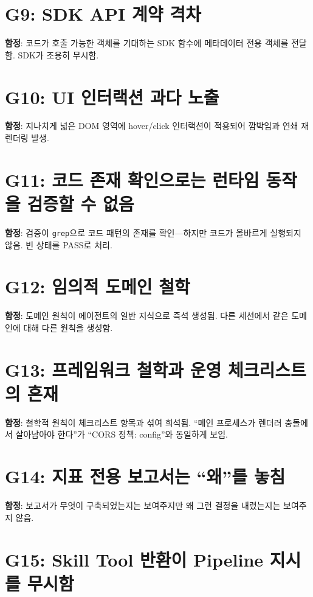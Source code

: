 \documentclass[11pt,a4paper,openright,twoside]{report}
\begin{document}
\section{G9: SDK API 계약 격차}

\textbf{함정}: 코드가 호출 가능한 객체를 기대하는 SDK 함수에 메타데이터 전용 객체를 전달함. SDK가 조용히 무시함.

\section{G10: UI 인터랙션 과다 노출}

\textbf{함정}: 지나치게 넓은 DOM 영역에 hover/click 인터랙션이 적용되어 깜박임과 연쇄 재렌더링 발생.

\section{G11: 코드 존재 확인으로는 런타임 동작을 검증할 수 없음}

\textbf{함정}: 검증이 \texttt{grep}으로 코드 패턴의 존재를 확인---하지만 코드가 올바르게 실행되지 않음. 빈 상태를 PASS로 처리.

\section{G12: 임의적 도메인 철학}

\textbf{함정}: 도메인 원칙이 에이전트의 일반 지식으로 즉석 생성됨. 다른 세션에서 같은 도메인에 대해 다른 원칙을 생성함.

\section{G13: 프레임워크 철학과 운영 체크리스트의 혼재}

\textbf{함정}: 철학적 원칙이 체크리스트 항목과 섞여 희석됨. ``메인 프로세스가 렌더러 충돌에서 살아남아야 한다''가 ``CORS 정책: config''와 동일하게 보임.

\section{G14: 지표 전용 보고서는 ``왜''를 놓침}

\textbf{함정}: 보고서가 무엇이 구축되었는지는 보여주지만 왜 그런 결정을 내렸는지는 보여주지 않음.

\section{G15: Skill Tool 반환이 Pipeline 지시를 무시함}
\end{document}
